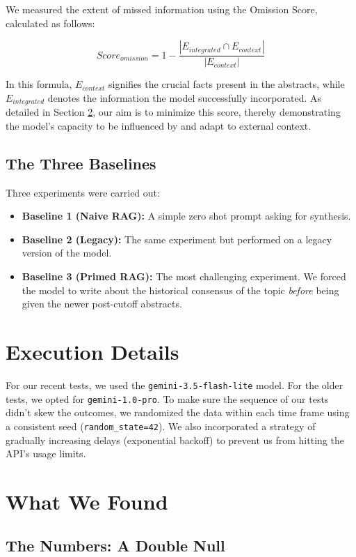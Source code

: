 \documentclass[acmsmall,screen,nonacm]{acmart}
\begin{document}
We measured the extent of missed information using the Omission Score, calculated as follows:

\begin{equation}
Score_{omission} = 1 - \frac{|E_{integrated} \cap E_{context}|}{|E_{context}|}
\end{equation}

In this formula, $E_{context}$ signifies the crucial facts present in the abstracts, while $E_{integrated}$ denotes the information the model successfully incorporated. As detailed in Section \ref{sec:results}, our aim is to minimize this score, thereby demonstrating the model's capacity to be influenced by and adapt to external context.



\subsection{The Three Baselines} \label{subsec:baselines}
Three experiments were carried out:
\begin{itemize}
\item \textbf{Baseline 1 (Naive RAG):} A simple zero shot prompt asking for synthesis.
\item \textbf{Baseline 2 (Legacy):} The same experiment but performed on a legacy version of the model.
\item \textbf{Baseline 3 (Primed RAG):} The most challenging experiment. We forced the model to write about the historical consensus of the topic \textit{before} being given the newer post-cutoff abstracts.
\end{itemize}

\section{Execution Details} \label{sec:setup}
For our recent tests, we used the \texttt{gemini-3.5-flash-lite} model. For the older tests, we opted for \texttt{gemini-1.0-pro}. To make sure the sequence of our tests didn't skew the outcomes, we randomized the data within each time frame using a consistent seed (\texttt{random\_state=42}). We also incorporated a strategy of gradually increasing delays (exponential backoff) to prevent us from hitting the API's usage limits.

\section{What We Found} \label{sec:results}
\subsection{The Numbers: A Double Null} \label{subsec:quantitative}
\end{document}
